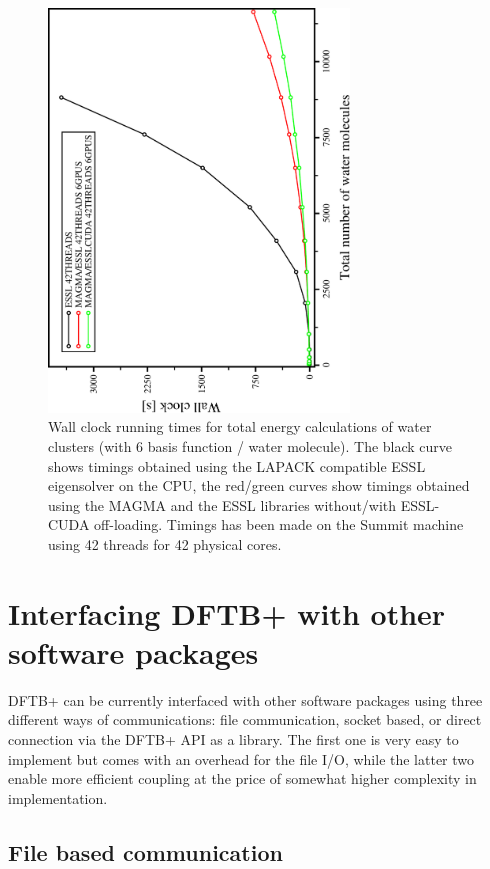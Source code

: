 \documentclass[reprint,onecolumn,superscriptaddress]{revtex4-1}
\newcommand{\dftbp}{DFTB+}
\begin{document}
\begin{figure}[htbp]
  \centering
  \includegraphics[width=8cm,angle=270]{summit-h2o.pdf}
  \caption{Wall clock running times for total energy calculations of water
    clusters (with 6 basis function / water molecule). The black curve shows
    timings obtained using the LAPACK compatible ESSL eigensolver on the CPU,
    the red/green curves show timings obtained using the MAGMA and the ESSL
    libraries without/with ESSL-CUDA off-loading. Timings has been made on the
    Summit machine using 42 threads for 42 physical cores.}
  \label{fig:gpu}
\end{figure}


\section{Interfacing \dftbp{} with other software packages}

\dftbp{} can be currently interfaced with other software packages using three
different ways of communications: file communication, socket based, or direct
connection via the \dftbp{} API as a library. The first one is very easy to
implement but comes with an overhead for the file I/O, while the latter two
enable more efficient coupling at the price of somewhat higher complexity in
implementation.

\subsection{File based communication}
\end{document}

